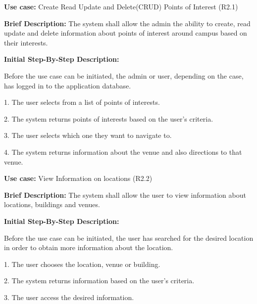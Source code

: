 \documentclass{article}
\begin{document}
\begin{flushleft}
    \textbf{Use case:} Create Read Update and Delete(CRUD) Points of Interest  (R2.1)
    \newline
    	
    \textbf{Brief Description:}
    \newline
    The system shall allow the admin the ability to create, read update and delete information about points of interest around campus based on their interests.
    \newline
    
    \textbf{Initial Step-By-Step Description:}
    
    Before the use case can be initiated, the admin or user, depending on the case, has logged in to the application database. 
	\newline    
	
1. The user selects from a list of points of interests.

2. The system returns points of interests based on the user's criteria.

3. The user selects which one they want to navigate to.

4. The system returns information about the venue and also directions to that venue.

\end{flushleft}

\begin{flushleft}
    \textbf{Use case:} View Information on locations  (R2.2)
    \newline
    	
    \textbf{Brief Description:}
    \newline
    The system shall allow the user to view information about locations, buildings and venues.
    \newline
    
    \textbf{Initial Step-By-Step Description:}
    
    Before the use case can be initiated, the user has searched for the desired location in order to obtain more information about the location.
	\newline    
	
1. The user chooses the location, venue or building.

2. The system returns information based on the user's criteria. 

3. The user access the desired information.

\end{flushleft}
\end{document}

